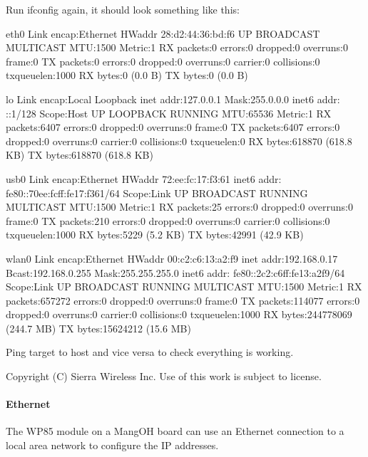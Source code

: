 Run {\ttfamily ifconfig} again, it should look something like this\+:

\begin{DoxyVerb}eth0      Link encap:Ethernet  HWaddr 28:d2:44:36:bd:f6
          UP BROADCAST MULTICAST  MTU:1500  Metric:1
          RX packets:0 errors:0 dropped:0 overruns:0 frame:0
          TX packets:0 errors:0 dropped:0 overruns:0 carrier:0
          collisions:0 txqueuelen:1000
          RX bytes:0 (0.0 B)  TX bytes:0 (0.0 B)

lo        Link encap:Local Loopback
          inet addr:127.0.0.1  Mask:255.0.0.0
          inet6 addr: ::1/128 Scope:Host
          UP LOOPBACK RUNNING  MTU:65536  Metric:1
          RX packets:6407 errors:0 dropped:0 overruns:0 frame:0
          TX packets:6407 errors:0 dropped:0 overruns:0 carrier:0
          collisions:0 txqueuelen:0
          RX bytes:618870 (618.8 KB)  TX bytes:618870 (618.8 KB)

usb0      Link encap:Ethernet  HWaddr 72:ee:fc:17:f3:61
          inet6 addr: fe80::70ee:fcff:fe17:f361/64 Scope:Link
          UP BROADCAST RUNNING MULTICAST  MTU:1500  Metric:1
          RX packets:25 errors:0 dropped:0 overruns:0 frame:0
          TX packets:210 errors:0 dropped:0 overruns:0 carrier:0
          collisions:0 txqueuelen:1000
          RX bytes:5229 (5.2 KB)  TX bytes:42991 (42.9 KB)

wlan0     Link encap:Ethernet  HWaddr 00:c2:c6:13:a2:f9
          inet addr:192.168.0.17  Bcast:192.168.0.255  Mask:255.255.255.0
          inet6 addr: fe80::2c2:c6ff:fe13:a2f9/64 Scope:Link
          UP BROADCAST RUNNING MULTICAST  MTU:1500  Metric:1
          RX packets:657272 errors:0 dropped:0 overruns:0 frame:0
          TX packets:114077 errors:0 dropped:0 overruns:0 carrier:0
          collisions:0 txqueuelen:1000
          RX bytes:244778069 (244.7 MB)  TX bytes:15624212 (15.6 MB)\end{DoxyVerb}


Ping target to host and vice versa to check everything is working.





Copyright (C) Sierra Wireless Inc. Use of this work is subject to license. \hypertarget{getstartedConfigIPeth}{}\paragraph{Ethernet}\label{getstartedConfigIPeth}
The W\+P85 module on a Mang\+O\+H board can use an Ethernet connection to a local area network to configure the I\+P addresses.

